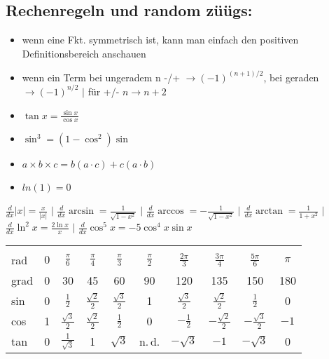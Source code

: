\documentclass[a3paper, ngerman, 8pt]{article}
\begin{document}
\begin{multicols*}{3}
\subsection*{Rechenregeln und random züügs:} 
\begin{itemize}
	\item wenn eine Fkt. symmetrisch ist, kann man einfach den positiven Definitionsbereich anschauen
	\item wenn ein Term bei ungeradem n -/+ $\to (-1)^{(n+1)/2}$, bei geraden $\to (-1)^{n/2}$ $ \big \vert$ für +/- $n \to n+2$
	\item $\tan x = \frac{\sin x}{\cos x}$
	\item $\sin^3=(1-\cos^2)\sin$
	\item $a \times b \times c = b(a \cdot c) + c(a \cdot b)$
	\item $ln(1)=0$
\end{itemize}

$\frac{d}{dx} |x| = \frac{x}{|x|}$ $\big \vert$ $\frac{d}{dx} \arcsin = 
\frac{1}{\sqrt{1-x^2}}$ $\big \vert$ $\frac{d}{dx} \arccos = -\frac{1}{\sqrt{1-x^2}}$ 
$\big \vert$ $\frac{d}{dx} \arctan = \frac{1}{1+x^2}$ $\big \vert$ $\frac{d}{dx} 
\ln^2x = \frac{2\ln x}{x}$ $\big \vert$ $\frac{d}{dx}\cos^5 x = -5\cos^4 x\sin x$

{\scriptsize
\vspace{2ex}
\begin{tabular}{lccccccccc}
    \hline \\
    rad     & $0$ & $\frac{\pi}{6}$ & $\frac{\pi}{4}$ & $\frac{\pi}{3}$ & 
    $\frac{\pi}{2}$ & $\frac{2 \pi}{3}$ & $\frac{3\pi}{4}$
                    & $\frac{5\pi}{6}$ & $\pi$ \\[1.2ex]

                    grad    & 0 & 30 & 45 & 60 & 90 & 120 & 135 & 150 & 180 \\[1.2ex]

    sin     & 0 & $\frac{1}{2}$ & $\frac{\sqrt{2}}{2}$ & $\frac{\sqrt{3}}{2}$ &
    1 & $\frac{\sqrt{3}}{2}$ & $\frac{\sqrt{2}}{2}$ & $\frac{1}{2}$ & 0
    \\[1.2ex]

    cos     & 1 & $\frac{\sqrt{3}}{2}$ & $\frac{\sqrt{2}}{2}$ & $\frac{1}{2}$ &
    0 & $-\frac{1}{2}$ & $-\frac{\sqrt{2}}{2}$ & $-\frac{\sqrt{3}}{2}$ & $-1$
    \\[1.2ex]

    tan     & 0 & $\frac{1}{\sqrt{3}}$ & 1 & $\sqrt{3}$ & n.\,d. & $-\sqrt{3}$ &
    $-1$ & $-\sqrt{3}$ & 0 \\[2ex]
    \hline
\end{tabular}
\vspace{2ex}
}





\end{multicols*}
\end{document}
